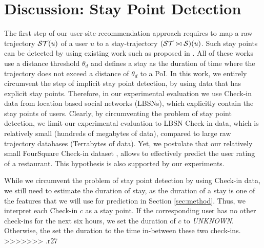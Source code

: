 \section{Discussion: Stay Point Detection} 
The first step of our user-site-recommendation approach requires to map a raw trajectory $\mathcal{ST}(u)$ of a user $u$ to a stay-trajectory $(\mathcal{ST}\bowtie\mathcal{S})(u)$. Such stay points can be detected by using existing work such as proposed in \cite{li2008mining,zheng2009mining,zheng2010geolife,xiao2010finding}. All of these works use a distance threshold $\theta_{d}$ and defines a stay as the duration of time where the trajectory does not exceed a distance of $\theta_{d}$ to a PoI. In this work, we entirely circumvent the step of implicit stay point detection, by using data that has explicit stay points. Therefore, in our experimental evaluation we use Check-in data from location based social networks (LBSNs), which explicitly contain the stay points of users. Clearly, by circumventing the problem of stay point detection, we limit our experimental evaluation to LBSN Check-in data, which is relatively small (hundreds of megabytes of data), compared to large raw trajectory databases (Terrabytes of data).
Yet, we postulate that our relatively small FourSquare Check-in dataset \cite{yang2014modeling}, allows to effectively predict the user rating of a restaurant. This hypothesis is also supported by our experiments.

While we circumvent the problem of stay point detection by using Check-in data, we still need to estimate the duration of stay, as the duration of a stay is one of the features that we will use for prediction in Section \ref{sec:method}. Thus, we interpret each Check-in $c$ as a stay point. If the corresponding user has no other check-ins for the next six hours, we set the duration of $c$ to \emph{UNKNOWN}. Otherwise, the set the duration to the time in-between these two check-ins.   >>>>>>> .r27
